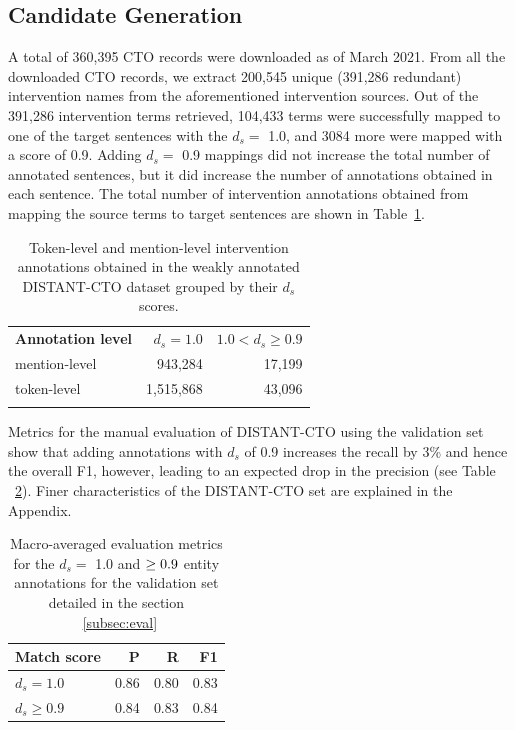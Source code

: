 \documentclass[11pt]{article}
\begin{document}
\subsection{Candidate Generation}
\label{subsec:res_cand}
%
A total of 360,395 CTO records were downloaded as of March 2021.
From all the downloaded CTO records, we extract 200,545 unique (391,286 redundant) intervention names from the aforementioned intervention sources.
Out of the 391,286 intervention terms retrieved, 104,433 terms were successfully mapped to one of the target sentences with the $d_s =$ 1.0, and 3084 more were mapped with a score of 0.9.
Adding $d_s =$ 0.9 mappings did not increase the total number of annotated sentences, but it did increase the number of annotations obtained in each sentence.
The total number of intervention annotations obtained from mapping the source terms to target sentences are shown in Table~\ref{table:res_candgen}.
%
\begin{table}[!htbp]
\centering
\begin{tabular}{lr|r}
\Xhline{1pt} \textbf{Annotation level} & \textbf{$d_s = 1.0$} & \textbf{$ 1.0 < d_s \geq 0.9$} \\ \Xhline{1pt}
mention-level & 943,284 & 17,199 \\
token-level & 1,515,868 & 43,096 \\
\Xhline{1pt}
\end{tabular}
\caption{Token-level and mention-level intervention annotations obtained in the weakly annotated DISTANT-CTO dataset grouped by their $d_s$ scores.}
\label{table:res_candgen} 
\end{table}
%
%
%
Metrics for the manual evaluation of DISTANT-CTO using the validation set show that adding annotations with $d_s$ of 0.9 increases the recall by 3\% and hence the overall F1, however, leading to an expected drop in the precision (see Table ~\ref{tab:cangen_eval}).
Finer characteristics of the DISTANT-CTO set are explained in the Appendix.

\begin{table}[!htbp]
\centering
\begin{tabular}{lrrr}
\hline \textbf{Match score} & \textbf{P} & \textbf{R} & \textbf{F1} \\ \hline
$d_s = 1.0$ & 0.86 & 0.80 & 0.83 \\
$d_s \geq 0.9$ & 0.84 & 0.83 & 0.84 \\
\hline
\end{tabular}
\caption{Macro-averaged evaluation metrics for the $d_s =$ 1.0 and $\protect\geq 0.9$ entity annotations for the validation set detailed in the section ~\ref{subsec:eval}}
\label{tab:cangen_eval} 
\end{table}
%
%
%
\end{document}
